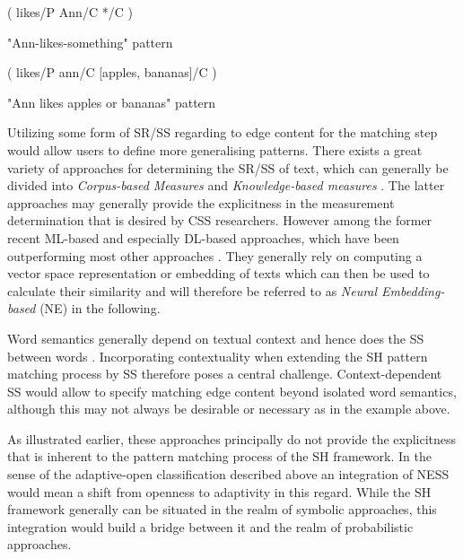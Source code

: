 \documentclass[11pt]{scrreprt}
\let\cite\parencite  %
\begin{document}
\begin{pattern}[h!]
  \normalfont\sffamily
  \centering
  ( likes/P Ann/C */C )
  \caption{"Ann-likes-something" pattern}
  \label{pat:ann-likes-something}
\end{pattern}

\begin{pattern}[h!]
  \normalfont\sffamily
  \centering
  ( likes/P ann/C [apples, bananas]/C )
  \caption{"Ann likes apples or bananas" pattern}
  \label{pat:ann-likes-apples-and-bananas}
\end{pattern}



Utilizing some form of SR/SS regarding to edge content for the matching step would allow users to define more generalising patterns. There exists a great variety of approaches for determining the SR/SS of text, which can generally be divided into \textit{Corpus-based Measures} and \textit{Knowledge-based measures} \cite[Section~1.3.2]{harispeSemanticSimilarityNatural2015}. The latter approaches may generally provide the explicitness in the measurement determination that is desired by CSS researchers. However among the former recent ML-based and especially DL-based approaches, which have been outperforming most other approaches \cite{chandrasekaranEvolutionSemanticSimilarity2021}. They generally rely on computing a vector space representation or embedding of texts which can then be used to calculate their similarity and will therefore be referred to as \textit{Neural Embedding-based} (NE) in the following. 

Word semantics generally depend on textual context and hence does the SS between words \cite[Section~2.2.3]{harispeSemanticSimilarityNatural2015}. Incorporating contextuality when extending the SH pattern matching process by SS therefore poses a central challenge. Context-dependent SS would allow to specify matching edge content beyond isolated word semantics, although this may not always be desirable or necessary as in the example above. 




As illustrated earlier, these approaches principally do not provide the explicitness that is inherent to the pattern matching process of the SH framework. In the sense of the adaptive-open classification described above an integration of NESS would mean a shift from openness to adaptivity in this regard. While the SH framework generally can be situated in the realm of symbolic approaches, this integration would build a bridge between it and the realm of probabilistic approaches.
\end{document}
